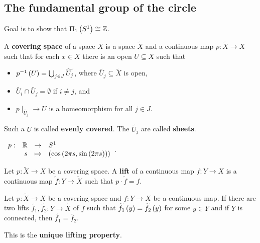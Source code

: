 \subsection{The fundamental group of the circle}

Goal is to show that $ \Pi_1\left( S^1 \right) \cong \mathbb{Z} $.


\begin{definition}
A \textbf{covering space} of a space $ X $ is a space $ \widetilde{X} $ and a continuous map $ p : \widetilde{X} \to X $ such that for each $ x \in X $ there is an open $ U \subseteq X $ such that
\begin{itemize}
\item $ p^{-1}\left( U \right) = \bigcup_{j \in J} \widetilde{U_j} $, where $ \widetilde{U_j} \subseteq \widetilde{X} $ is open,
\item $ \widetilde{U_i} \cap \widetilde{U_j} = \emptyset $ if $ i \ne j $, and
\item $ p \mid_{\widetilde{U_j}} \to U $ is a homeomorphism for all $ j \in J $.
\end{itemize}
Such a $ U $ is called \textbf{evenly covered}. The $ \widetilde{U_j} $ are called \textbf{sheets}.
\end{definition}

\begin{example1}
$ \function[p]{\R}{S^1}{s}{\rb{\cos\rb{2\pi s, \sin\rb{2\pi s}}}} $.
\end{example1}

\begin{definition}
Let $ p : \widetilde{X} \to X $ be a covering space. A \textbf{lift} of a continuous map $ f : Y \to X $ is a continuous map $ \widetilde{f} : Y \to \widetilde{X} $ such that $ p \cdot \widetilde{f} = f $.
\end{definition}

\begin{proposition}
\label{prop:1.34}
Let $ p : \widetilde{X} \to X $ be a covering space and $ f : Y \to X $ be a continuous map. If there are two lifts $ \widetilde{f_1}, \widetilde{f_2} : Y \to \widetilde{X} $ of $ f $ such that $ \widetilde{f_1}\left( y \right) = \widetilde{f_2}\left( y \right) $ for some $ y \in Y $ and if $ Y $ is connected, then $ \widetilde{f_1} = \widetilde{f_2} $.
\end{proposition}

This is the \textbf{unique lifting property}.

